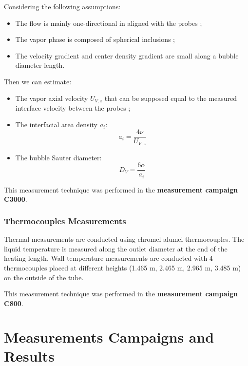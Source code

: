 Considering the following assumptions:

\begin{itemize}
\item The flow is mainly one-directional in aligned with the probes ;
\item The vapor phase is composed of spherical inclusions ;
\item The velocity gradient and center density gradient are small along a bubble diameter length.
\end{itemize}

Then we can estimate: 

\begin{itemize}
\item The vapor axial velocity $U_{V,z}$ that can be supposed equal to the measured interface velocity between the probes ;
\item The interfacial area density $a_{i}$:
\begin{equation}
a_{i} = \frac{4 \nu }{U_{V,z}}
\end{equation}
\item The bubble Sauter diameter:
\begin{equation}
D_{V} = \frac{6 \alpha }{a_{i}}
\end{equation}
\end{itemize}


\begin{note*}{}
This measurement technique was performed in the \textbf{measurement campaign C3000}.
\end{note*}


\subsubsection{Thermocouples Measurements}

Thermal measurements are conducted using chromel-alumel thermocouples. The liquid temperature is measured along the outlet diameter at the end of the heating length. Wall temperature measurements are conducted with 4 thermocouples placed at different heights (1.465 m, 2.465 m, 2.965 m, 3.485 m) on the outside of the tube.

\begin{note*}{}
This measurement technique was performed in the \textbf{measurement campaign C800}.
\end{note*}



\section{Measurements Campaigns and Results}

